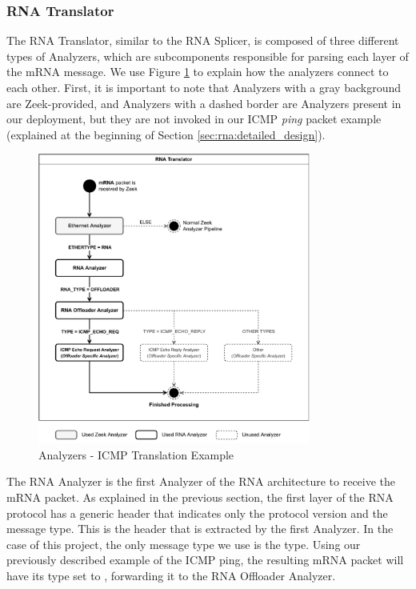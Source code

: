\subsubsection*{RNA Translator}

The RNA Translator, similar to the RNA Splicer, is composed of three different types of Analyzers, which are subcomponents responsible for parsing each layer of the mRNA message. We use Figure \ref{fig:icmp_ex_translator} to explain how the analyzers connect to each other. First, it is important to note that Analyzers with a gray background are Zeek-provided, and Analyzers with a dashed border are Analyzers present in our deployment, but they are not invoked in our ICMP \textit{ping} packet example (explained at the beginning of Section \ref{sec:rna:detailed_design}).

\begin{figure}[ht]
    \caption{Analyzers - ICMP Translation Example}
    \begin{center}
        \includegraphics[width=0.8\textwidth]{images/icmp_ex_translator.pdf}  
    \end{center}
    \label{fig:icmp_ex_translator}
\end{figure}

The RNA Analyzer is the first Analyzer of the RNA architecture to receive the mRNA packet. As explained in the previous section, the first layer of the RNA protocol has a generic header that indicates only the protocol version and the message type. This is the header that is extracted by the first Analyzer. In the case of this project, the only message type we use is the \Offloader{} type\footnotemark. Using our previously described example of the ICMP ping, the resulting mRNA packet will have its type set to \textsc{\Offloader{}}, forwarding it to the RNA Offloader Analyzer.

